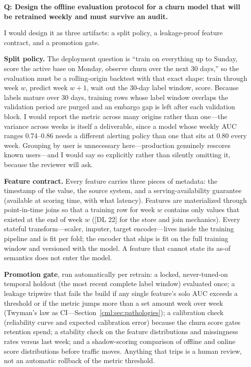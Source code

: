\begin{interviewq}
\textbf{Q: Design the offline evaluation protocol for a churn model that will be retrained weekly and must survive an audit.}

 \quad {} \quad \badgefreq{\freqlow}

\stronganswer

I would design it as three artifacts: a split policy, a leakage-proof feature contract, and a promotion gate.

\textbf{Split policy.} The deployment question is ``train on everything up to Sunday, score the active base on Monday, observe churn over the next 30 days,'' so the evaluation must be a rolling-origin backtest with that exact shape: train through week $w$, predict week $w{+}1$, wait out the 30-day label window, score. Because labels mature over 30 days, training rows whose label window overlaps the validation period are purged and an embargo gap is left after each validation block. I would report the metric across many origins rather than one---the variance across weeks is itself a deliverable, since a model whose weekly AUC ranges 0.74--0.86 needs a different alerting policy than one that sits at 0.80 every week. Grouping by user is unnecessary here---production genuinely rescores known users---and I would say so explicitly rather than silently omitting it, because the reviewer will ask.

\textbf{Feature contract.} Every feature carries three pieces of metadata: the timestamp of the value, the source system, and a serving-availability guarantee (available at scoring time, with what latency). Features are materialized through point-in-time joins so that a training row for week $w$ contains only values that existed at the end of week $w$ ([DL 22] for the store and join mechanics). Every stateful transform---scaler, imputer, target encoder---lives inside the training pipeline and is fit per fold; the encoder that ships is fit on the full training window and versioned with the model. A feature that cannot state its as-of semantics does not enter the model.

\textbf{Promotion gate}, run automatically per retrain: a locked, never-tuned-on temporal holdout (the most recent complete label window) evaluated once; a leakage tripwire that fails the build if any single feature's solo AUC exceeds a threshold or if the metric jumps more than a set amount week over week (Twyman's law as CI---Section~\ref{cml:sec:pathologies}); a calibration check (reliability curve and expected calibration error) because the churn score gates retention spend; a stability check on the feature distributions and missingness rates versus last week; and a shadow-scoring comparison of offline and online score distributions before traffic moves. Anything that trips is a human review, not an automatic rollback of the metric threshold.


\end{interviewq}

